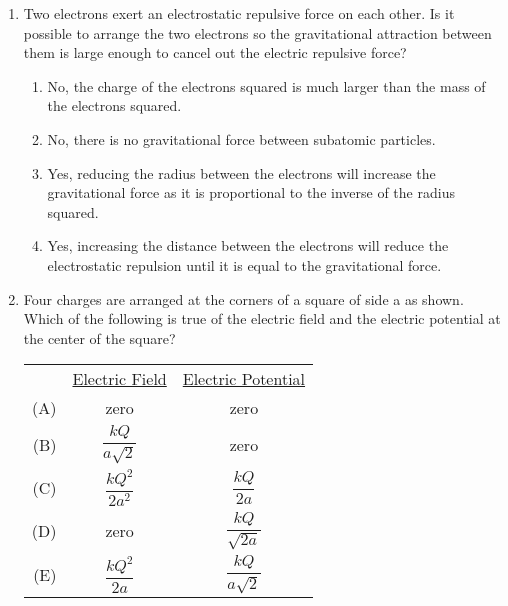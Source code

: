 \documentclass{../../../oss-classkick}
\begin{document}
\begin{multicols*}{2}
\begin{enumerate}[leftmargin=18pt]
   \item Two electrons exert an electrostatic repulsive force on each other. Is
     it possible to arrange the two electrons so the gravitational attraction
     between them is large enough to cancel out the electric repulsive force?
     \begin{enumerate}[nosep,leftmargin=18pt,label=(\Alph*)]
     \item  No, the charge of the electrons squared is much larger than the
       mass of the electrons squared.
     \item No, there is no gravitational force between subatomic particles.
     \item Yes, reducing the radius between the electrons will increase the
       gravitational force as it is proportional to the inverse of the radius
       squared.
     \item Yes, increasing the distance between the electrons will reduce the
       electrostatic repulsion until it is equal to the gravitational force.
     \end{enumerate}
     \vspace{.7in}
     \columnbreak
     
  \item Four charges are arranged at the corners of a square of side a as shown.
    Which of the following is true of the electric field and the electric
    potential at the center of the square?
    \begin{center}
    \end{center}
    \begin{tabular}{rcc}
      & \underline{Electric Field} & \underline{Electric Potential}\\
      (A) & zero & zero \\
      (B) & $\dfrac{kQ}{a\sqrt{2}}$ & zero \\
      (C) & $\dfrac{kQ^2}{2a^2}$ &  $\dfrac{kQ}{2a}$\\
      (D) & zero &  $\dfrac{kQ}{\sqrt{2a}}$\\
      (E) & $\dfrac{kQ^2}{2a}$ & $\dfrac{kQ}{a\sqrt{2}}$
    \end{tabular}
    \vspace{.7in}
    

\end{enumerate}
\end{multicols*}
\end{document}
